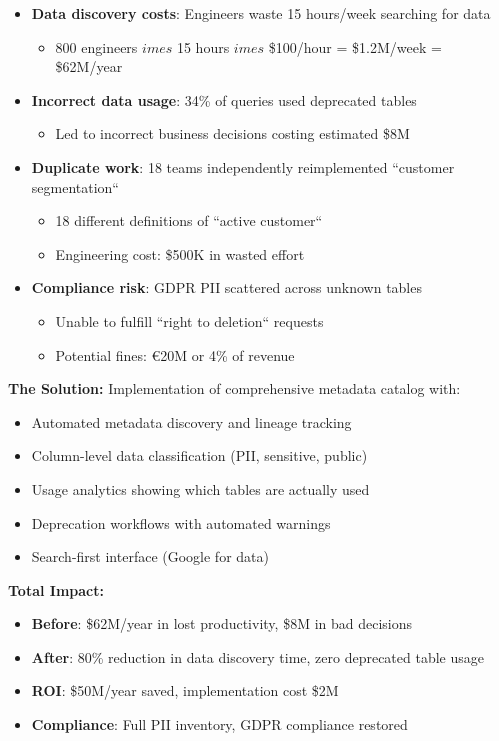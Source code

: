\begin{itemize}
    \item \textbf{Data discovery costs}: Engineers waste 15 hours/week searching for data
    \begin{itemize}
        \item 800 engineers $	imes$ 15 hours $	imes$ \$100/hour = \$1.2M/week = \$62M/year
    \end{itemize}
    \item \textbf{Incorrect data usage}: 34\% of queries used deprecated tables
    \begin{itemize}
        \item Led to incorrect business decisions costing estimated \$8M
    \end{itemize}
    \item \textbf{Duplicate work}: 18 teams independently reimplemented ``customer segmentation``
    \begin{itemize}
        \item 18 different definitions of ``active customer``
        \item Engineering cost: \$500K in wasted effort
    \end{itemize}
    \item \textbf{Compliance risk}: GDPR PII scattered across unknown tables
    \begin{itemize}
        \item Unable to fulfill ``right to deletion`` requests
        \item Potential fines: €20M or 4\% of revenue
    \end{itemize}
\end{itemize}

\textbf{The Solution:} Implementation of comprehensive metadata catalog with:
\begin{itemize}
    \item Automated metadata discovery and lineage tracking
    \item Column-level data classification (PII, sensitive, public)
    \item Usage analytics showing which tables are actually used
    \item Deprecation workflows with automated warnings
    \item Search-first interface (Google for data)
\end{itemize}

\textbf{Total Impact:}
\begin{itemize}
    \item \textbf{Before}: \$62M/year in lost productivity, \$8M in bad decisions
    \item \textbf{After}: 80\% reduction in data discovery time, zero deprecated table usage
    \item \textbf{ROI}: \$50M/year saved, implementation cost \$2M
    \item \textbf{Compliance}: Full PII inventory, GDPR compliance restored
\end{itemize}

